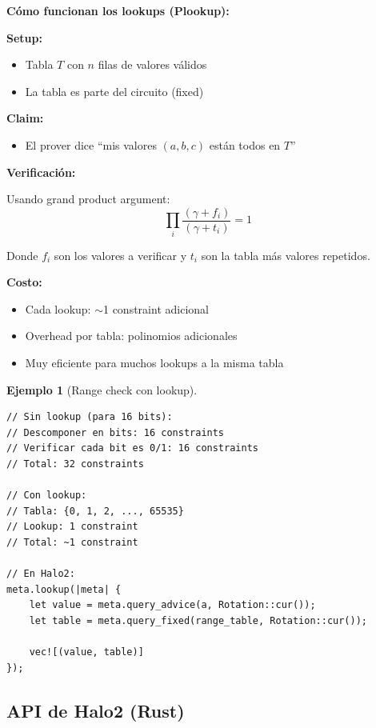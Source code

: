 \documentclass[11pt,a4paper,twoside,openright]{book}
\theoremstyle{definition}
\newtheorem{example}{Ejemplo}[chapter]
\theoremstyle{plain}
\theoremstyle{remark}
\begin{document}
\begin{mathnote}
\textbf{Cómo funcionan los lookups (Plookup):}

\textbf{Setup:}
\begin{itemize}
    \item Tabla $T$ con $n$ filas de valores válidos
    \item La tabla es parte del circuito (fixed)
\end{itemize}

\textbf{Claim:}
\begin{itemize}
    \item El prover dice ``mis valores $(a, b, c)$ están todos en $T$''
\end{itemize}

\textbf{Verificación:}

Usando grand product argument:
\[ \prod_i \frac{(\gamma + f_i)}{(\gamma + t_i)} = 1 \]

Donde $f_i$ son los valores a verificar y $t_i$ son la tabla más valores repetidos.

\textbf{Costo:}
\begin{itemize}
    \item Cada lookup: $\sim$1 constraint adicional
    \item Overhead por tabla: polinomios adicionales
    \item Muy eficiente para muchos lookups a la misma tabla
\end{itemize}
\end{mathnote}

\begin{example}[Range check con lookup]
\begin{verbatim}
// Sin lookup (para 16 bits):
// Descomponer en bits: 16 constraints
// Verificar cada bit es 0/1: 16 constraints
// Total: 32 constraints

// Con lookup:
// Tabla: {0, 1, 2, ..., 65535}
// Lookup: 1 constraint
// Total: ~1 constraint

// En Halo2:
meta.lookup(|meta| {
    let value = meta.query_advice(a, Rotation::cur());
    let table = meta.query_fixed(range_table, Rotation::cur());
    
    vec![(value, table)]
});
\end{verbatim}
\end{example}

\subsection{API de Halo2 (Rust)}
\end{document}
